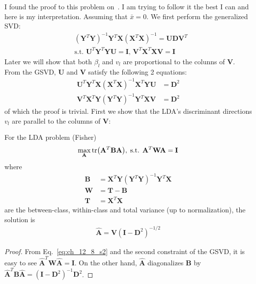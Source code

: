 \begin{exercise}
  I found the proof to this problem on~\cite{hastie1994flexible}. I am trying to
  follow it the best I can and here is my interpretation. Assuming that $\bar{x}
  = 0$. We first perform the generalized SVD:
  \begin{align}
    & (\mathbf{Y}^T\mathbf{Y})^{-1}\mathbf{Y}^T\mathbf{X}
    (\mathbf{X}^T\mathbf{X})^{-1} = \mathbf{UDV}^T \\
    & \mbox{s.t. } \mathbf{U}^T\mathbf{Y}^T\mathbf{YU} = \mathbf{I},\, 
    \mathbf{V}^T\mathbf{X}^T\mathbf{XV} = \mathbf{I}
  \end{align}
  Later we will show that both $\beta_l$ and $v_l$ are proportional to the
  colunns of $\mathbf{V}$. From the GSVD, $\mathbf{U}$ and $\mathbf{V}$ satisfy
  the following 2 equations:
  \begin{subequations}
    \begin{align}
      \mathbf{U}^T\mathbf{Y}^T\mathbf{X}
      (\mathbf{X}^T\mathbf{X})^{-1}\mathbf{X}^T\mathbf{YU} & = \mathbf{D}^2
      \label{eq:ch_12_8_s1}\\
      \mathbf{V}^T\mathbf{X}^T\mathbf{Y}
      (\mathbf{Y}^T\mathbf{Y})^{-1} \mathbf{Y}^T\mathbf{XV} &= \mathbf{D}^2
      \label{eq:ch_12_8_s2}
    \end{align}
  \end{subequations}
  of which the proof is trivial. First we show that the LDA's discriminant
  directions $v_l$ are parallel to the columns of $\mathbf{V}$:
  \begin{proposition}
    For the LDA problem (Fisher)
    \begin{align}
      \max_{\mathbf{A}}\tr(\mathbf{A}^T\mathbf{BA}),\;\mbox{s.t. }
      \mathbf{A}^T\mathbf{WA} = \mathbf{I}
    \end{align}
    where 
    \begin{subequations}
      \begin{align}
        \mathbf{B} & = \mathbf{X}^T\mathbf{Y}
        (\mathbf{Y}^T\mathbf{Y})^{-1} \mathbf{Y}^T\mathbf{X} \\
        \mathbf{W} & = \mathbf{T} - \mathbf{B} \\
        \mathbf{T} & = \mathbf{X}^T\mathbf{X}
      \end{align}
    \end{subequations}
    are the between-class, within-class and total variance (up to
    normalization), the solution is
    \begin{align}
      \hat{\mathbf{A}} = \mathbf{V}(\mathbf{I} - \mathbf{D}^2)^{-1/2}
    \end{align}
  \end{proposition}
  \begin{proof}
    From Eq.~\eqref{eq:ch_12_8_s2} and the second constraint of the GSVD, it is
    easy to see $\hat{\mathbf{A}}^T\mathbf{W}\hat{\mathbf{A}} = \mathbf{I}$. On
    the other hand, $\hat{\mathbf{A}}$ diagonalizes $\mathbf{B}$ by
    $\hat{\mathbf{A}}^T\mathbf{B}\hat{\mathbf{A}} = (\mathbf{I} -
    \mathbf{D}^2)^{-1}\mathbf{D}^2$.
  \end{proof}
  

\end{exercise}
